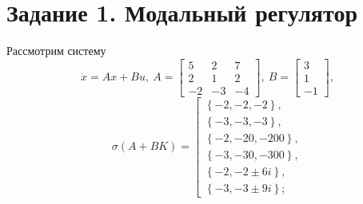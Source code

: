 \documentclass[a4paper, 12pt]{article}
\begin{document}
    \section{Задание 1. Модальный регулятор}
    Рассмотрим систему
    $$
    \dot{x}=Ax+Bu,\ A=\begin{bmatrix}
        5 &2 &7\\
        2 &1 &2\\
        -2 &-3 &-4
    \end{bmatrix},\ B=\begin{bmatrix}
        3\\
        1\\
        -1
    \end{bmatrix},
    $$
    $$
    \sigma\left(A+BK\right)= 
    \left[ 
      \begin{gathered} 
        \left\{-2,-2,-2\right\}, \\ 
        \left\{-3,-3,-3\right\}, \\
        \left\{-2,-20,-200\right\},\\
        \left\{-3,-30,-300\right\},\\
        \left\{-2,-2\pm6i\right\},\\
        \left\{-3,-3\pm9i\right\};
      \end{gathered} 
\right.
    $$

    
\end{document}
